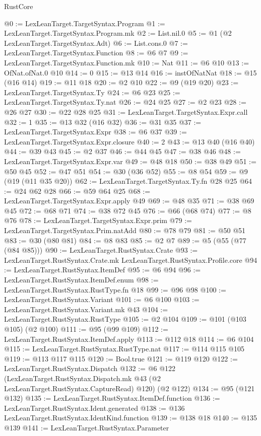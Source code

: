 \begin{lexlean}{RustCore}
\begin{coremodule}
@0 := LexLeanTarget.TargetSyntax.Program
@1 := LexLeanTarget.TargetSyntax.Program.mk
@2 := List.nil.{0}
@5 := @1 (@2 LexLeanTarget.TargetSyntax.Adt)
@6 := List.cons.{0}
@7 := LexLeanTarget.TargetSyntax.Function
@8 := @6 @7
@9 := LexLeanTarget.TargetSyntax.Function.mk
@10 := Nat
@11 := @6 @10
@13 := OfNat.ofNat.{0} @10
@14 := 0
@15 := @13 @14
@16 := instOfNatNat
@18 := @15 (@16 @14)
@19 := @11 @18
@20 := @2 @10
@22 := @9 (@19 @20)
@23 := LexLeanTarget.TargetSyntax.Ty
@24 := @6 @23
@25 := LexLeanTarget.TargetSyntax.Ty.nat
@26 := @24 @25
@27 := @2 @23
@28 := @26 @27
@30 := @22 @28 @25
@31 := LexLeanTarget.TargetSyntax.Expr.call
@32 := 1
@35 := @13 @32 (@16 @32)
@36 := @31 @35
@37 := LexLeanTarget.TargetSyntax.Expr
@38 := @6 @37
@39 := LexLeanTarget.TargetSyntax.Expr.closure
@40 := 2
@43 := @13 @40 (@16 @40)
@44 := @39 @43
@45 := @2 @37
@46 := @44 @45
@47 := @38 @46
@48 := LexLeanTarget.TargetSyntax.Expr.var
@49 := @48 @18
@50 := @38 @49
@51 := @50 @45
@52 := @47 @51
@54 := @30 (@36 @52)
@55 := @8 @54
@59 := @9 (@19 (@11 @35 @20))
@62 := LexLeanTarget.TargetSyntax.Ty.fn @28 @25
@64 := @24 @62 @28
@66 := @59 @64 @25
@68 := LexLeanTarget.TargetSyntax.Expr.apply @49
@69 := @48 @35
@71 := @38 @69 @45
@72 := @68 @71
@74 := @38 @72 @45
@76 := @66 (@68 @74)
@77 := @8 @76
@78 := LexLeanTarget.TargetSyntax.Expr.prim
@79 := LexLeanTarget.TargetSyntax.Prim.natAdd
@80 := @78 @79
@81 := @50 @51
@83 := @30 (@80 @81)
@84 := @8 @83
@85 := @2 @7
@89 := @5 (@55 (@77 (@84 @85)))
@90 := LexLeanTarget.RustSyntax.Crate
@93 := LexLeanTarget.RustSyntax.Crate.mk LexLeanTarget.RustSyntax.Profile.core
@94 := LexLeanTarget.RustSyntax.ItemDef
@95 := @6 @94
@96 := LexLeanTarget.RustSyntax.ItemDef.enum
@98 := LexLeanTarget.RustSyntax.RustType.fn @18
@99 := @96 @98
@100 := LexLeanTarget.RustSyntax.Variant
@101 := @6 @100
@103 := LexLeanTarget.RustSyntax.Variant.mk @43
@104 := LexLeanTarget.RustSyntax.RustType
@105 := @2 @104
@109 := @101 (@103 @105) (@2 @100)
@111 := @95 (@99 @109)
@112 := LexLeanTarget.RustSyntax.ItemDef.apply
@113 := @112 @18
@114 := @6 @104
@115 := LexLeanTarget.RustSyntax.RustType.nat
@117 := @114 @115 @105
@119 := @113 @117 @115
@120 := Bool.true
@121 := @119 @120
@122 := LexLeanTarget.RustSyntax.Dispatch
@132 := @6
    @122
    (LexLeanTarget.RustSyntax.Dispatch.mk @43 (@2 LexLeanTarget.RustSyntax.CaptureRead) @120)
    (@2 @122)
@134 := @95 (@121 @132)
@135 := LexLeanTarget.RustSyntax.ItemDef.function
@136 := LexLeanTarget.RustSyntax.Ident.generated
@138 := @136 LexLeanTarget.RustSyntax.IdentKind.function
@139 := @138 @18
@140 := @135 @139
@141 := LexLeanTarget.RustSyntax.Parameter

\end{coremodule}
\end{lexlean}
